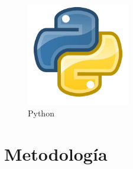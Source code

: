 \documentclass{article}
\begin{document}

  \begin{figure}[H]
    \centering
    \includegraphics[width=0.4\textwidth, keepaspectratio]{img/python.png}
    \caption{Python}
  \end{figure}
  \newpage
  

  \section{Metodología}
  
\end{document}
